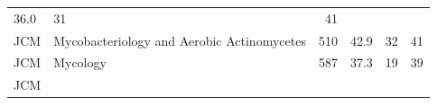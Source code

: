 \documentclass[11pt,]{article}
\begin{document}
\begin{longtable}[]{@{}llrrrr@{}}
\begin{minipage}[t]{0.08\columnwidth}
36.0\strut
\end{minipage} & \begin{minipage}[t]{0.11\columnwidth}\raggedleft\strut
31\strut
\end{minipage} & \begin{minipage}[t]{0.11\columnwidth}\raggedleft\strut
41\strut
\end{minipage}\tabularnewline
\begin{minipage}[t]{0.06\columnwidth}\raggedright\strut
JCM\strut
\end{minipage} & \begin{minipage}[t]{0.43\columnwidth}\raggedright\strut
Mycobacteriology and Aerobic Actinomycetes\strut
\end{minipage} & \begin{minipage}[t]{0.04\columnwidth}\raggedleft\strut
510\strut
\end{minipage} & \begin{minipage}[t]{0.08\columnwidth}\raggedleft\strut
42.9\strut
\end{minipage} & \begin{minipage}[t]{0.11\columnwidth}\raggedleft\strut
32\strut
\end{minipage} & \begin{minipage}[t]{0.11\columnwidth}\raggedleft\strut
41\strut
\end{minipage}\tabularnewline
\begin{minipage}[t]{0.06\columnwidth}\raggedright\strut
JCM\strut
\end{minipage} & \begin{minipage}[t]{0.43\columnwidth}\raggedright\strut
Mycology\strut
\end{minipage} & \begin{minipage}[t]{0.04\columnwidth}\raggedleft\strut
587\strut
\end{minipage} & \begin{minipage}[t]{0.08\columnwidth}\raggedleft\strut
37.3\strut
\end{minipage} & \begin{minipage}[t]{0.11\columnwidth}\raggedleft\strut
19\strut
\end{minipage} & \begin{minipage}[t]{0.11\columnwidth}\raggedleft\strut
39\strut
\end{minipage}\tabularnewline
\begin{minipage}[t]{0.06\columnwidth}\raggedright\strut
JCM\strut
\end{minipage} & \begin{minipage}[t]{0.43\columnwidth}\raggedright\strut

\end{minipage}
\end{longtable}
\end{document}
